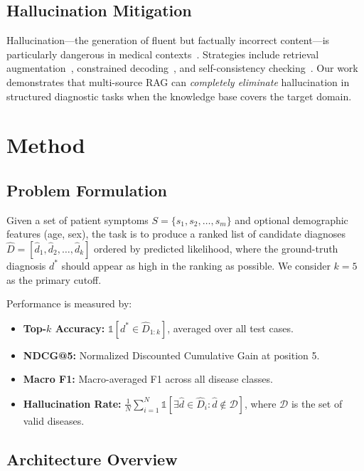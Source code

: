 \documentclass[preprint,12pt]{elsarticle}
\begin{document}
\subsection{Hallucination Mitigation}

Hallucination---the generation of fluent but factually incorrect content---is particularly dangerous in medical contexts~\cite{ji2023survey,umapathi2023med}. Strategies include retrieval augmentation~\cite{shuster2021retrieval}, constrained decoding~\cite{lu2022neurologic}, and self-consistency checking~\cite{manakul2023selfcheckgpt}. Our work demonstrates that multi-source RAG can \emph{completely eliminate} hallucination in structured diagnostic tasks when the knowledge base covers the target domain.

\section{Method}
\label{sec:method}

\subsection{Problem Formulation}

Given a set of patient symptoms $S = \{s_1, s_2, \ldots, s_m\}$ and optional demographic features (age, sex), the task is to produce a ranked list of candidate diagnoses $\hat{D} = [\hat{d}_1, \hat{d}_2, \ldots, \hat{d}_k]$ ordered by predicted likelihood, where the ground-truth diagnosis $d^*$ should appear as high in the ranking as possible. We consider $k=5$ as the primary cutoff.

Performance is measured by:
\begin{itemize}
    \item \textbf{Top-$k$ Accuracy:} $\mathbb{1}[d^* \in \hat{D}_{1:k}]$, averaged over all test cases.
    \item \textbf{NDCG@5:} Normalized Discounted Cumulative Gain at position 5.
    \item \textbf{Macro F1:} Macro-averaged F1 across all disease classes.
    \item \textbf{Hallucination Rate:} $\frac{1}{N}\sum_{i=1}^{N} \mathbb{1}[\exists \hat{d} \in \hat{D}_i : \hat{d} \notin \mathcal{D}]$, where $\mathcal{D}$ is the set of valid diseases.
\end{itemize}

\subsection{Architecture Overview}
\end{document}
